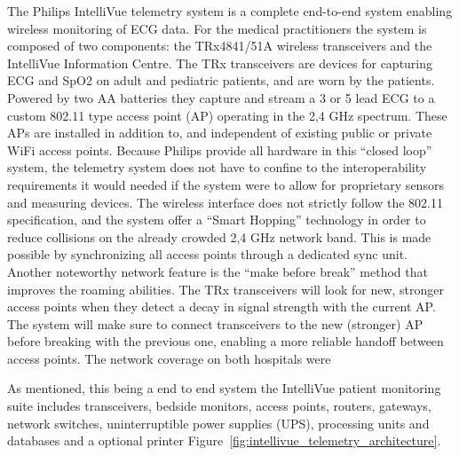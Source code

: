 The Philips IntelliVue telemetry system is a complete end-to-end system enabling wireless monitoring of ECG data. For the medical practitioners the system is composed of two components: the TRx4841/51A wireless transceivers and the IntelliVue Information Centre. The TRx transceivers are devices for capturing ECG and SpO2 on adult and pediatric patients, and are worn by the patients. Powered by two AA batteries they  capture and stream a 3 or 5 lead ECG to a custom 802.11 type access point (AP) operating in the 2,4 GHz spectrum. These APs are installed in addition to, and independent of existing public or private WiFi access points. Because Philips provide all hardware in this ``closed loop'' system, the telemetry system does not have to confine to the interoperability requirements it would needed if the system were to allow for proprietary sensors and measuring devices. The wireless interface does not strictly follow the 802.11 specification, and the system offer a ``Smart Hopping'' technology in order to reduce collisions on the already crowded 2,4 GHz network band. This is made possible by synchronizing all access points through a dedicated sync unit. Another noteworthy network feature is the ``make before break'' method that improves the roaming abilities. The TRx transceivers will look for new, stronger access points when they detect a decay in signal strength with the current AP. The system will make sure to connect transceivers to the new (stronger) AP before breaking with the previous one, enabling a more reliable handoff between access points. The network coverage on both hospitals were 

As mentioned, this being a end to end system the IntelliVue patient monitoring suite includes transceivers, bedside monitors, access points, routers, gateways, network switches, uninterruptible power supplies (UPS), processing units and databases and a optional printer Figure~\ref{fig:intellivue_telemetry_architecture}.


